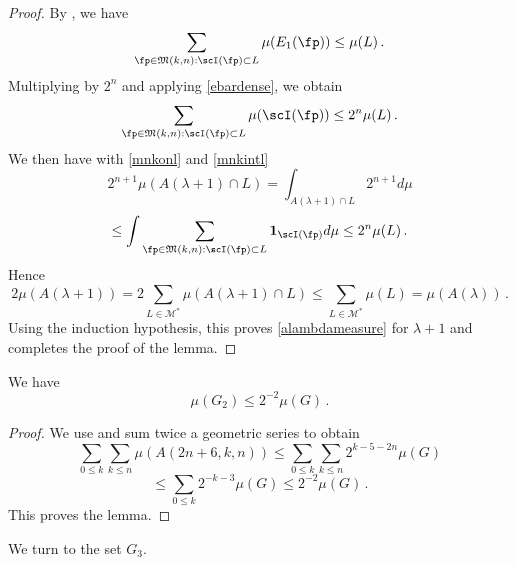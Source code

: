 \begin{proof}
By , we have
\begin{equation}
\sum_{\fp \in {\mathfrak{M}}(k,n):\scI(\fp) \subset L} \mu({E_1}(\fp)) \leq \mu(L)\, .
\end{equation}
Multiplying by $2^n$ and applying \eqref{ebardense}, we obtain
\begin{equation}\label{mnkintl}
    \sum_{\fp \in {\mathfrak{M}}(k,n):\scI(\fp) \subset L} \mu(\scI(\fp)) \leq 2^n \mu(L)\, .
\end{equation}
We then have with \eqref{mnkonl} and \eqref{mnkintl}
\begin{equation}
2^{n+1}\mu(A(\lambda+1)\cap L) =
 \int_{A(\lambda+1)\cap L} 2^{n+1} d\mu
\end{equation}
\begin{equation}
\le
    \int \sum_{\fp \in {\mathfrak{M}}(k,n):\scI(\fp) \subset L} \mathbf{1}_{\scI(\fp)} d\mu
\le 2^n \mu(L)\, .
\end{equation}
Hence
\begin{equation}
    2\mu(A(\lambda+1))=2\sum_{L\in \mathcal{M}^*}
\mu(A(\lambda+1)\cap L)\le
\sum_{L\in \mathcal{M}^*}\mu( L)= \mu(A(\lambda))\, .
\end{equation}
Using the induction hypothesis, this proves
\eqref{alambdameasure} for $\lambda+1$ and completes the proof of the lemma.
\end{proof}

\begin{lemma}
\label{second-exception}
\leanok
{}
We have
\begin{equation}
    \mu(G_2)\le 2^{-2} \mu(G)\, .
\end{equation}
\end{lemma}
\begin{proof}
\leanok
We use  and sum twice a geometric series
to obtain
\begin{equation}
    \sum_{0\le k}\sum_{k\le n}
\mu(A(2n+6,k,n))\le \sum_{0\le k}\sum_{k\le n} 2^{k-5-2n}\mu(G)
\end{equation}
\begin{equation}
   \le \sum_{0\le k} 2^{-k-3}\mu(G)\le 2^{-2}\mu(G)\, .
\end{equation}
This proves the lemma.
\end{proof}


We turn to the set $G_3$.


